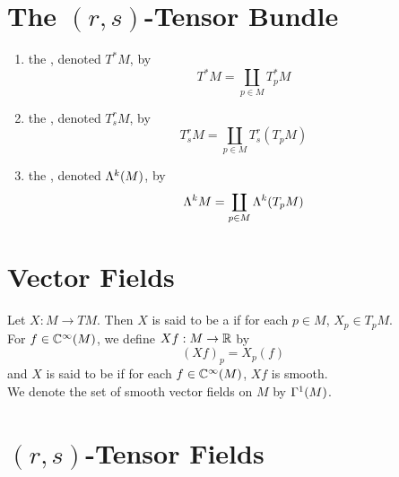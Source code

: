 \documentclass{book}
\begin{document}
	
	
	
	
	\section{The $(r,s)$-Tensor Bundle}
	
	\begin{defn}
	\begin{enumerate}
		\item the , denoted $T^*M$, by 
		$$T^*M = \coprod_{p \in M} T_p^*M$$
		\item the , denoted $T^r_sM$, by
	$$T^r_s M = \coprod_{p \in M} T^r_s(T_p M)$$
	\item the , denoted $\Lambda^k(M)$, by
	$$\Lambda^kM = \coprod_{p \in M} \Lambda^k(T_pM)$$
		\end{enumerate}
	\end{defn}
	
	
	
	
	
	
	
	
	
	
	
	
	
	
	\newpage	
	\section{Vector Fields}
	
	\begin{defn}
		Let $X: M \rightarrow TM$. Then $X$ is said to be a  if for each $p \in M$, $X_p \in T_p M$. \\
		For $f \in \mathbb{C}^{\infty}(M)$, we define $Xf : M \rightarrow \mathbb{R}$ by $$(Xf)_p = X_p(f)$$ 
		and $X$ is said to be  if for each $f \in \mathbb{C}^{\infty}(M)$, $Xf$ is smooth.\\
		We denote the set of smooth vector fields on $M$ by $\Gamma^1(M)$.
	\end{defn}

	
	
	
	\begin{ex}
	
	\end{ex}
	
	
	
	
	
	
	
	
	\newpage
	\section{$(r,s)$-Tensor Fields}
	
\end{document}
